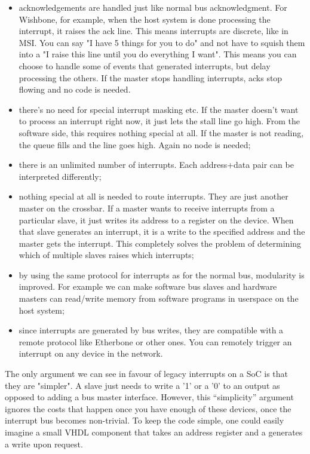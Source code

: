 \documentclass[a4paper, 12pt]{article}
\begin{document}
\begin{itemize}

\item acknowledgements are handled just like normal bus acknowledgment.
For Wishbone, for example, when the host
system is done processing the interrupt, it raises the ack line. This
means interrupts are discrete, like in MSI. You can say "I have 5 things
for you to do" and not have to squish them into a "I raise this line
until you do everything I want". This means you can choose to handle
some of events that generated interrupts, but delay processing the
others. If the master stops handling interrupts, acks stop flowing
and no code is needed.

\item there's no need for special interrupt masking etc. If the
master doesn't 
want to process an interrupt right now, it just lets the stall line go high.
From the software side, this requires nothing special at all. If the master
is not reading, the queue fills and the line goes high. Again no node
is needed;

\item there is an unlimited number of interrupts. Each address+data
pair can be interpreted differently;

\item nothing special at all is needed to route interrupts. They
are just another master on the crossbar. If a master wants to receive
interrupts from a particular slave, it just writes its address to a
register on the device. When that slave generates an interrupt, it is a
write to the specified address and the master gets the interrupt. This completely
solves the problem of determining which of multiple slaves
raises which interrupts;

\item by using the same protocol for interrupts as for the normal bus,
modularity is improved. For example we can make software bus slaves and
hardware masters can read/write
memory from software programs in userspace on the host system;

\item since interrupts are generated by bus writes, they are compatible
with a remote protocol like Etherbone or other ones.
You can remotely trigger an interrupt on any device in the
network.
\end{itemize}

The only argument we can see in favour of legacy interrupts on a SoC is
that they are "simpler". A slave just needs to write a '1' or a '0' to
an output as opposed to adding a bus master interface. However,
this ``simplicity'' argument ignores the costs that happen once you have
enough of these devices, once the
interrupt bus becomes non-trivial. To keep the code simple, one could
easily imagine a small VHDL component that takes an address register and
a generates a write upon request.
\end{document}
